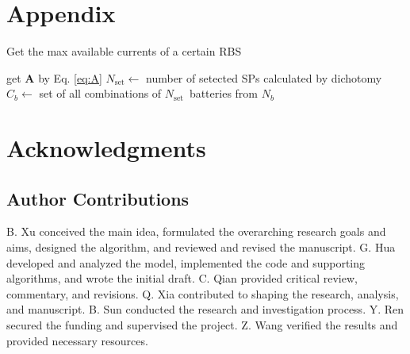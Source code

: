 \documentclass{article}
\begin{document}
\section{Appendix} 

\begin{algorithm}
    \caption{Get the max available currents of a certain RBS}\label{alg:greedy}
    \KwResult{$\max \eta$}
    get $\bm{A}$ by Eq. \ref{eq:A}\;
    {
        $N_{\text{set}} \leftarrow$ number of setected SPs calculated by dichotomy\;
        $C_b    \leftarrow$ set of all combinations of $N_{\text{set}} $~batteries from $N_b$\;
    }
\end{algorithm}


\section*{Acknowledgments}

\subsection*{Author Contributions} 

B. Xu conceived the main idea, formulated the overarching research goals and aims, designed the algorithm, and reviewed and revised the manuscript.
G. Hua developed and analyzed the model, implemented the code and supporting algorithms, and wrote the initial draft.
C. Qian provided critical review, commentary, and revisions.
Q. Xia contributed to shaping the research, analysis, and manuscript.
B. Sun conducted the research and investigation process.
Y. Ren secured the funding and supervised the project.
Z. Wang verified the results and provided necessary resources.
\end{document}
